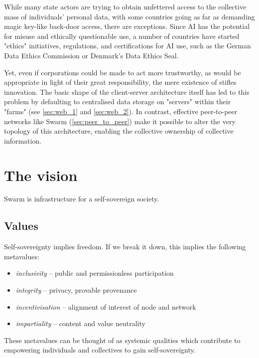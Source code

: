 While many state actors are trying to obtain unfettered access to the collective mass of individuals' personal data, with some countries going as far as demanding magic key-like back-door access, there are exceptions. Since AI has the potential for misuse and ethically questionable use, a number of countries have started "ethics" initiatives, regulations, and certifications for AI use, such as the German Data Ethics Commission or Denmark's Data Ethics Seal. 

Yet, even if corporations could be made to act more trustworthy, as would be appropriate in light of their great responsibility, the mere existence of  stifles innovation. The basic shape of the client-server architecture itself has led to this problem by defaulting to centralised data storage on "servers" within their "farms" (see \ref{sec:web_1} and \ref{sec:web_2}). In contrast, effective peer-to-peer networks like Swarm (\ref{sec:peer_to_peer}) make it possible to alter the very topology of this architecture, enabling the collective ownership of collective information. 


\section{The vision  \statusorange}\label{sec:vision}

\begin{displayquote}
Swarm is infrastructure for a self-sovereign society. 
\end{displayquote}


\subsection{Values \statusorange}\label{sec:values}

Self-sovereignty implies freedom. If we break it down, this implies the following metavalues: 

\begin{itemize}[noitemsep]
\item \emph{inclusivity} -- public and permissionless participation
\item \emph{integrity} -- privacy, provable provenance 
\item \emph{incentivisation} -- alignment of interest of node and network
\item \emph{impartiality} --  content and value neutrality  
\end{itemize}

These metavalues can be thought of as systemic qualities which contribute to empowering individuals and collectives to gain self-sovereignty.

